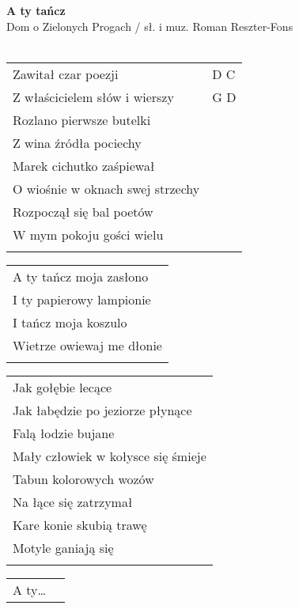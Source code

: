 \documentclass[a5paper]{article}
\begin{document}


\noindent
\fontsize{12pt}{15pt}\selectfont
\textbf{A ty tańcz} \\
\fontsize{8pt}{10pt}\selectfont
Dom o Zielonych Progach / sł. i muz. Roman Reszter-Fons \\ \\
\fontsize{10pt}{12pt}\selectfont
{}
\begin{tabular}{@{}p{8.5cm}p{3cm}@{}}
\noindent
Zawitał czar poezji & D C \\
Z właścicielem słów i wierszy & G D \\
Rozlano pierwsze butelki & \\
Z wina źródła pociechy & \\
Marek cichutko zaśpiewał & \\
O wiośnie w oknach swej strzechy & \\
Rozpoczął się bal poetów & \\
W mym pokoju gości wielu & \\ \\
\end{tabular}

\noindent
\begin{tabular}{@{}p{8.5cm}@{}}
A ty tańcz moja zasłono \\
I ty papierowy lampionie \\
I tańcz moja koszulo \\
Wietrze owiewaj me dłonie \\ \\
\end{tabular}

\noindent
\begin{tabular}{@{}p{9.5cm}@{}}
Jak gołębie lecące \\
Jak łabędzie po jeziorze płynące \\
Falą łodzie bujane \\
Mały człowiek w kołysce się śmieje \\
Tabun kolorowych wozów \\
Na łące się zatrzymał \\
Kare konie skubią trawę \\
Motyle ganiają się \\ \\
\end{tabular}

\noindent
\begin{tabular}{@{}p{8.5cm}p{3cm}@{}}
A ty…
\end{tabular}
\end{document}
